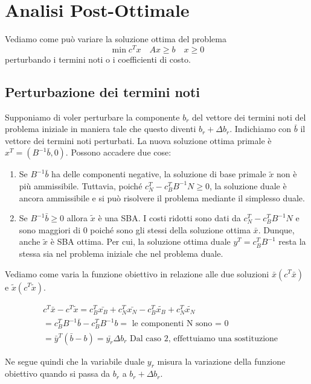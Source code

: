 \section{Analisi Post-Ottimale}
Vediamo come può variare la soluzione ottima del problema 
\[\min c^Tx \quad Ax\geq b \quad x \geq 0\]
perturbando i termini noti o i coefficienti di costo.
\subsection{Perturbazione dei termini noti}
Supponiamo di voler perturbare la componente $b_r$ del vettore dei termini noti del problema iniziale in maniera tale che questo diventi $b_r+\Delta b_r$. Indichiamo con $\bar{b}$ il vettore dei termini noti perturbati. La nuova soluzione ottima primale è $x^T=(B^{-1}\bar{b},0)$.
Possono accadere due cose:
\begin{enumerate}
    \item Se $B^{-1}\bar{b}$ ha delle componenti negative, la soluzione di base primale $\tilde{x}$ non è più ammissibile. Tuttavia, poiché $c_N^T-c_B^T B^{-1}N\geq 0$, la soluzione duale è ancora ammissibile e si può risolvere il problema mediante il simplesso duale. 
    \item Se $B^{-1}\bar{b}\geq 0$ allora $\tilde{x}$ è una SBA. I costi ridotti sono dati da  $c_N^T-c_B^T B^{-1}N$ e sono maggiori di 0 poiché sono gli stessi della soluzione ottima $\bar{x}$. Dunque, anche $\tilde{x}$ è SBA ottima. Per cui, la soluzione ottima duale $y^T =c^T_B B^{-1}$ resta la stessa sia nel problema iniziale che nel problema duale.
\end{enumerate}
Vediamo come varia la funzione obiettivo in relazione alle due soluzioni $\bar{x}(c^T\bar{x})$ e $\tilde{x}(c^T\tilde{x})$.

\begin{align*}
    &c^T\bar{x}-c^T\tilde{x}=c^T_B\bar{x_B}+c^T_N\bar{x_N}-c^T_B\tilde{x_B}+c^T_N\tilde{x_N}\\
    &=c^T_B B^{-1}\bar{b}-c^T_B B^{-1}b = \text{ le componenti N sono = 0}\\
    &=\bar{y}^T (\bar{b}-b)= \bar{y_r}\Delta b_r \text{ Dal caso 2, effettuiamo una sostituzione}
\end{align*}

Ne segue quindi che la variabile duale $y_r$ misura la variazione della funzione obiettivo quando si passa da $b_r$ a $b_r+\Delta b_r$.

